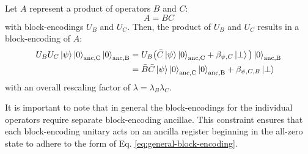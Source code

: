 Let $A$ represent a product of operators $B$ and $C$:
\begin{equation}
    \label{eq:product}
    A = BC
\end{equation}
with block-encodings $U_B$ and $U_C$.
Then, the product of $U_B$ and $U_C$ results in a block-encoding of $A$:
\begin{equation}
    \begin{split}
        U_B U_C \ket{\psi} \ket{0}_\text{anc,C}\ket{0}_\text{anc,B} &= U_B \big(\bar{C} \ket{\psi} \ket{0}_\text{anc,C} + \beta_{\psi, C} \ket{\perp}\big)\ket{0}_\text{anc,B} \\
        &= \bar{B} \bar{C} \ket{\psi} \ket{0}_\text{anc,C} \ket{0}_\text{anc,B} + \beta_{\psi, C, B} \ket{\perp}
    \end{split}
\end{equation}
with an overall rescaling factor of $\lambda = \lambda_B \lambda_C$.

It is important to note that in general the block-encodings for the individual operators require separate block-encoding ancillae.
This constraint ensures that each block-encoding unitary acts on an ancilla register beginning in the all-zero state to adhere to the form of Eq. \ref{eq:general-block-encoding}.